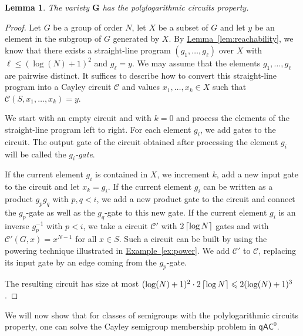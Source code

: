 \documentclass[11pt]{article}
\numberwithin{equation}{section}
\newtheorem{lemma}[theorem]{Lemma}
\theoremstyle{definition}
\theoremstyle{plain}
\newcommand{\C}{\mathbb C}
\newcommand{\expref}[2]{\hyperref[#2]{#1~\ref{#2}}}
\renewcommand{\leq}{\leqslant}
\renewcommand{\le}{\leq}
\newcommand{\ceil}[1]{\ensuremath\left\lceil#1\right\rceil}
\newcommand{\qAC}{\ensuremath{\mathsf{qAC}}}
\newcommand{\vG}{\mathbf{G}}
\renewcommand{\C}{\ensuremath{\mathcal{C}}}
\newcommand{\SCSM}{Cayley semigroup membership}
\newcommand{\SCSMP}{{\SCSM} problem}
\newcommand{\SPLCP}{polylogarithmic circuits property}
\begin{document}
\begin{lemma}
  The variety $\vG$ has the {\SPLCP}.
  \label{lem:groups}
\end{lemma}
%
\begin{proof}
  Let $G$ be a group of order $N$, let $X$ be a subset of $G$ and let $y$ be an
  element in the subgroup of $G$ generated by $X$.
  By \expref{Lemma}{lem:reachability}, we know that there exists a straight-line
  program $(g_1, \dots, g_\ell)$ over $X$ with $\ell \le (\log(N) + 1)^2$ and
  $g_\ell = y$.
  We may assume that the elements $g_1, \dots, g_\ell$ are pairwise distinct.
  It suffices to describe how to convert this straight-line program into a
  Cayley circuit $\C$ and values $x_1, \dots, x_k \in X$ such that $\C(S, x_1,
  \dots, x_k) = y$.

  We start with an empty circuit and with $k = 0$ and process the elements of
  the straight-line program left to right. For each element $g_i$, we add gates
  to the circuit. The output gate of the circuit obtained after processing the
  element $g_i$ will be called the \emph{$g_i$-gate}.

  If the current element $g_i$ is contained in $X$, we increment $k$, add a new
  input gate to the circuit and let $x_k = g_i$.
  If the current element $g_i$ can be written as a product $g_p g_q$ with
  $p, q < i$, we add a new product gate to the circuit and connect the
  $g_p$-gate as well as the $g_q$-gate to this new gate.
  If the current element $g_i$ is an inverse $g_p^{-1}$ with $p < i$, we take a
  circuit $\C'$ with $2\ceil{\log N}$ gates and with $\C'(G, x) = x^{N-1}$ for
  all $x \in S$.
  Such a circuit can be built by using the powering technique illustrated in
  \expref{Example}{ex:power}.
  We add $\C'$ to $\C$, replacing its input gate
  by an edge coming from the $g_p$-gate.

  The resulting circuit has size at most $(\log(N) + 1)^2 \cdot 2\ceil{\log N}
  \le 2(\log(N) + 1)^3$.
\end{proof}

We will now show that for classes of semigroups with the {\SPLCP}, one can
solve the {\SCSMP} in $\qAC^0$.
\end{document}
